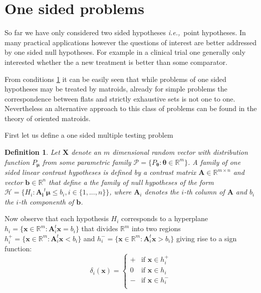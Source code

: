 \documentclass[a4paper,12pt]{article}
\newtheorem{definition}{Definition}
\newcommand{\bs}[1]{\boldsymbol{#1}}
\newcommand{\ie}{{\em i.e.,}~}
\begin{document}
\section{One sided problems}

So far we have only considered two sided hypotheses \ie point
hypotheses. In many practical applications however the questions of
interest are better addressed by one sided null hypotheses. For
example in a clinical trial one generally only interested whether the
a new treatment is better than some comparator. 

From conditions \ref{} it can be easily seen that while problems of
one sided hypotheses may be treated by matroids, already for simple
problems the correspondence between flats and strictly exhaustive sets
is not one to one. Nevertheless an alternative approach to this class
of problems can be found in the theory of oriented matroids.

First let us define a one sided multiple testing problem

\begin{definition}
  Let $\bs{X}$ denote an $m$ dimensional random vector with
  distribution function $P_{\bs{\mu}}$ from some parametric family
  $\mathscr{P} = \{P_{\bs{\theta}}: \bs{\theta} \in \mathbb{R}^m\}$. A
  family of {\em one sided linear contrast hypotheses} is defined by a
  contrast matrix $\bs{A} \in \mathbb{R}^{m\times n}$ and vector
  $\bs{b} \in \mathbb{R}^n$ that define a the family of null
  hypotheses of the form $\mathscr{H} = \{H_i: \bs{A_i}^t\bs{\mu} \leq
  b_i,i \in \{1,...,n\}\}$, where $\bs{A}_i$ denotes the $i$-th column
  of $\bs{A}$ and $b_i$ the $i$-th componenth of $\bs{b}$.
\end{definition}

Now observe that each hypothesis $H_i$ corresponds to a hyperplane
$h_i = \{\bs{x} \in \mathbb{R}^m: \bs{A}_i^t\bs{x} = b_i\}$ that divides
$\mathbb{R}^m$ into two regions $h_i^+ = \{\bs{x} \in \mathbb{R}^m:
\bs{A}_i^t\bs{x} < b_i\}$ and $h_i^- = \{\bs{x} \in \mathbb{R}^m: \bs{A}_i^t\bs{x} >
b_i\}$ giving rise to a sign function:
\begin{equation}
  \label{eq:sign}
  \delta_i(\bs{x}) = \left\{
\begin{array}{ll}
  + & \text{if } \bs{x} \in h_i^+\\
  0 & \text{if } \bs{x} \in h_i \\
  - & \text{if } \bs{x} \in h_i^-\\
\end{array}\right.
\end{equation}
\end{document}
